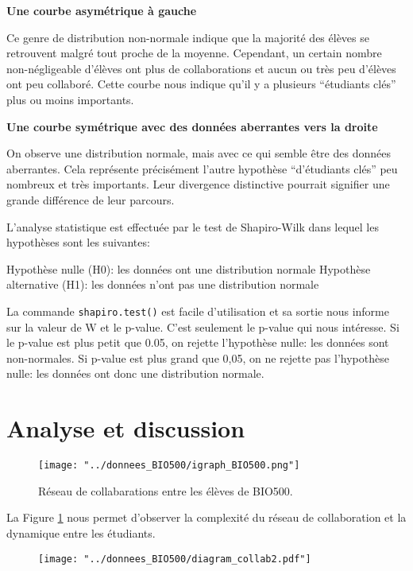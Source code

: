 \documentclass[9pt,twocolumn,twoside,]{pnas-new}
\begin{document}
\textbf{Une courbe asymétrique à gauche}

Ce genre de distribution non-normale indique que la majorité des élèves
se retrouvent malgré tout proche de la moyenne. Cependant, un certain
nombre non-négligeable d'élèves ont plus de collaborations et aucun ou
très peu d'élèves ont peu collaboré. Cette courbe nous indique qu'il y a
plusieurs ``étudiants clés'' plus ou moins importants.

\textbf{Une courbe symétrique avec des données aberrantes vers la
droite}

On observe une distribution normale, mais avec ce qui semble être des
données aberrantes. Cela représente précisément l'autre hypothèse
``d'étudiants clés'' peu nombreux et très importants. Leur divergence
distinctive pourrait signifier une grande différence de leur parcours.

L'analyse statistique est effectuée par le test de Shapiro-Wilk dans
lequel les hypothèses sont les suivantes:

Hypothèse nulle (H0): les données ont une distribution normale Hypothèse
alternative (H1): les données n'ont pas une distribution normale

La commande \texttt{shapiro.test()} est facile d'utilisation et sa
sortie nous informe sur la valeur de W et le p-value. C'est seulement le
p-value qui nous intéresse. Si le p-value est plus petit que 0.05, on
rejette l'hypothèse nulle: les données sont non-normales. Si p-value est
plus grand que 0,05, on ne rejette pas l'hypothèse nulle: les données
ont donc une distribution normale.

\hypertarget{analyse-et-discussion}{%
\section{Analyse et discussion}\label{analyse-et-discussion}}

\begin{figure}
\centering
\texttt{[image: "../donnees\_BIO500/igraph\_BIO500.png"]}
\caption{Réseau de collabarations entre les élèves de BIO500.
\label{fig:plot1}}
\end{figure}

La Figure \ref{fig:plot1} nous permet d'observer la complexité du réseau
de collaboration et la dynamique entre les étudiants.

\begin{figure}
\centering
\texttt{[image: "../donnees\_BIO500/diagram\_collab2.pdf"]}
\caption{\label{fig:plot2}}
\end{figure}
\end{document}
